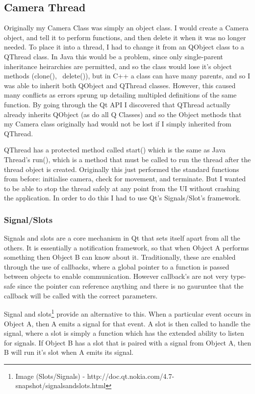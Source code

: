 {{\subsection{Camera Thread}
Originally my Camera Class was simply an object class. I would create a Camera object, and tell it to perform functions, and then delete it when it was no longer needed. To place it into a thread, I had to change it from an QObject class to a QThread class. In Java this would be a problem, since only single-parent inheritance heirarchies are permitted, and so the class would lose it's object methods (clone(), ~delete()), but in C++ a class can have many parents, and so I was able to inherit both QObject and QThread classes.
However, this caused many conflicts as errors sprung up detailing multipled definitions of the same function. By going through the Qt API I discovered that QThread actually already inherits QObject (as do all Q Classes) and so the Object methods that my Camera class originally had would not be lost if I simply inherited from QThread.

QThread has a protected method called start() which is the same as Java Thread's run(), which is a method that must be called to run the thread after the thread object is created. Originally this just performed the standard functions from before:  initialise camera, check for movement, and terminate. But I wanted to be able to stop the thread safely at any point from the UI without crashing the application. In order to do this I had to use Qt's Signals/Slot's framework.

\subsubsection{Signal/Slots}
Signals and slots are a core mechanism in Qt that sets itself apart from all the others. It is essentially a notification framework, so that when Object A performs something then Object B can know about it.  Traditionally, these are enabled through the use of callbacks, where a global pointer to a function is passed between objects to enable communication. However callback's are not very type-safe since the pointer can reference anything and there is no gauruntee that the callback will be called with the correct parameters.

Signal and slots\footnote{Image (Slots/Signals) - http://doc.qt.nokia.com/4.7-snapshot/signalsandslots.html} provide an alternative to this. When a particular event occurs in Object A, then A emits a signal for that event. A slot  is then called to handle the signal, where a slot is simply a function which has the extended ability to listen for signals. If Object B has a slot that is paired with a signal from Object A, then  B will run it's slot when A emits its signal.

}}
